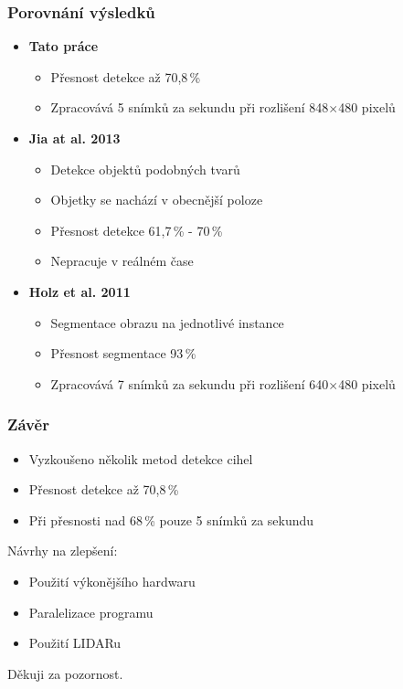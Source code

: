 \begin{frame}
\frametitle{Porovnání výsledků}
 \begin{itemize}
     \item \textbf{Tato práce}
         \begin{itemize}
             \item Přesnost detekce až 70,8\,\%
             \item Zpracovává 5 snímků za sekundu při rozlišení 848$\times$480 pixelů 
         \end{itemize}
    \item \textbf{Jia at al. 2013}
        \begin{itemize}
            \item Detekce objektů podobných tvarů
            \item Objetky se nachází v obecnější poloze
            \item Přesnost detekce 61,7\,\% - 70\,\%
            \item Nepracuje v reálném čase
        \end{itemize}
     \item \textbf{Holz et al. 2011} 
         \begin{itemize} 
            \item Segmentace obrazu na jednotlivé instance
            \item Přesnost segmentace 93\,\%
            \item Zpracovává 7 snímků za sekundu při rozlišení 640$\times$480 pixelů
         \end{itemize}
 \end{itemize}
\end{frame}

\begin{frame}
    \frametitle{Závěr}
    \begin{itemize}
        \item Vyzkoušeno několik metod detekce cihel
        \item Přesnost detekce až 70,8\,\%
        \item Při přesnosti nad 68\,\% pouze 5 snímků za sekundu
    \end{itemize}    
    Návrhy na zlepšení:
    \begin{itemize}
        \item Použití výkonějšího hardwaru
        \item Paralelizace programu
        \item Použití LIDARu
    \end{itemize}
\end{frame}


\begin{frame}
    \begin{center}
    \huge Děkuji za pozornost.
    \end{center}    
\end{frame}

